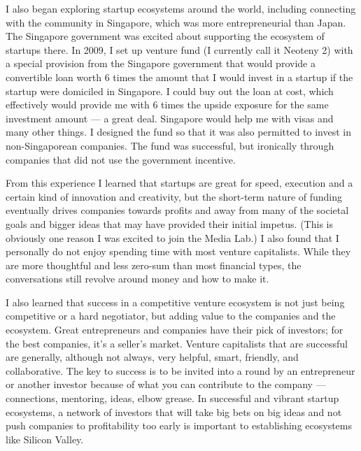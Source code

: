 I also began exploring startup ecosystems around the world, including connecting with the community in Singapore, which was more entrepreneurial than Japan. The Singapore government was excited about supporting the ecosystem of startups there. In 2009, I set up venture fund (I currently call it Neoteny 2) with a special provision from the Singapore government that would provide a convertible loan worth 6 times the amount that I would invest in a startup if the startup were domiciled in Singapore. I could buy out the loan at cost, which effectively would provide me with 6 times the upside exposure for the same investment amount — a great deal. Singapore would help me with visas and many other things. I designed the fund so that it was also permitted to invest in non-Singaporean companies. The fund was successful, but ironically through companies that did not use the government incentive.


From this experience I learned that startups are great for speed, execution and a certain kind of innovation and creativity, but the short-term nature of funding eventually drives companies towards profits and away from many of the societal goals and bigger ideas that may have provided their initial impetus. (This is obviously one reason I was excited to join the Media Lab.) I also found that I personally do not enjoy spending time with most venture capitalists. While they are more thoughtful and less zero-sum than most financial types, the conversations still revolve around money and how to make it. 

I also learned that success in a competitive venture ecosystem is not just being competitive or a hard negotiator, but adding value to the companies and the ecosystem. Great entrepreneurs and companies have their pick of investors; for the best companies, it's a seller's market. Venture capitalists that are successful are generally, although not always, very helpful, smart, friendly, and collaborative. The key to success is to be invited into a round by an entrepreneur or another investor because of what you can contribute to the company --- connections, mentoring, ideas, elbow grease. In successful and vibrant startup ecosystems, a network of investors that will take big bets on big ideas and not push companies to profitability too early is important to establishing ecosystems like Silicon Valley. 

